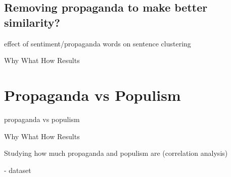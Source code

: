 \subsection{Removing propaganda to make better similarity?}

effect of sentiment/propaganda words on sentence clustering

Why
What
How
Results

\section{Propaganda vs Populism}

propaganda vs populism

Why
What
How
Results

Studying how much propaganda and populism are (correlation analysis)

- dataset
